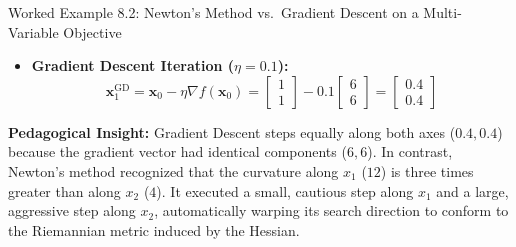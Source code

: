 \begin{examplebox}[breakable]{Worked Example 8.2: Newton's Method vs.\ Gradient Descent on a Multi-Variable Objective}
\begin{itemize}
    \item \textbf{Gradient Descent Iteration ($\eta = 0.1$):}
    \begin{equation}
    \mathbf{x}_1^{\text{GD}} = \mathbf{x}_0 - \eta \nabla f(\mathbf{x}_0) = \begin{bmatrix} 1 \\ 1 \end{bmatrix} - 0.1 \begin{bmatrix} 6 \\ 6 \end{bmatrix} = \begin{bmatrix} 0.4 \\ 0.4 \end{bmatrix}
    \end{equation}
\end{itemize}
\textbf{Pedagogical Insight:} Gradient Descent steps equally along both axes ($0.4, 0.4$) because the gradient vector had identical components ($6, 6$). In contrast, Newton's method recognized that the curvature along $x_1$ ($12$) is three times greater than along $x_2$ ($4$). It executed a small, cautious step along $x_1$ and a large, aggressive step along $x_2$, automatically warping its search direction to conform to the Riemannian metric induced by the Hessian.
\end{examplebox}

